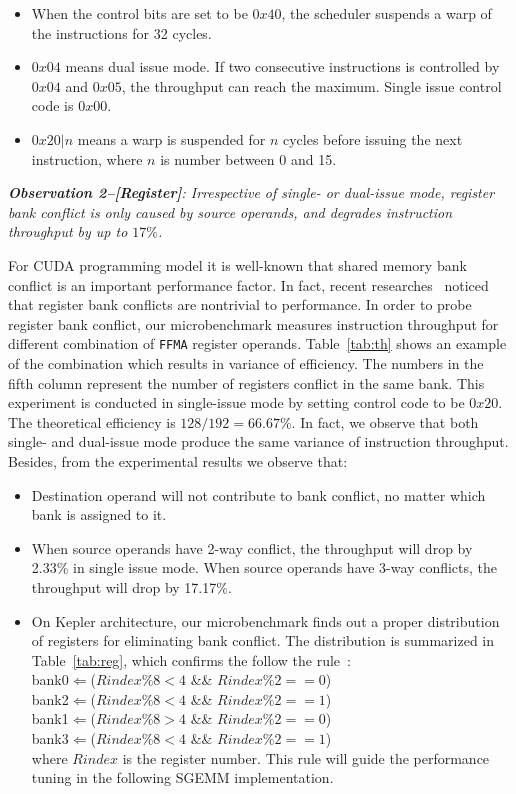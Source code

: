 \documentclass{sig-alternate-05-2015}
\begin{document}
\begin{itemize}
\item When the control bits are set to be $0x40$, the scheduler suspends a warp of the instructions for 32 cycles.
\item $0x04$ means dual issue mode. If two consecutive instructions is controlled by $0x04$ and $0x05$, the throughput can reach the maximum. Single issue control code is $0x00$.
\item $0x20|n$ means a warp is suspended for $n$ cycles before issuing the next instruction, where $n$ is number between 0 and 15.
\end{itemize}


{\em {\bf Observation 2--[Register]}: Irrespective of single- or dual-issue mode, register bank conflict is only caused by source operands, and degrades instruction throughput by up to $17\%$.}

For CUDA programming model it is well-known that shared memory bank conflict is an important performance factor. In fact, recent researches~\cite{} noticed that register bank conflicts are nontrivial to performance.  In order to probe register bank conflict, our microbenchmark measures instruction throughput for different combination of {\tt FFMA} register operands. Table~\ref{tab:th} shows an example of the combination which results in variance of efficiency. The numbers in the fifth column represent the number of registers conflict in the same bank. This experiment is conducted in single-issue mode by setting control code to be $0x20$. The theoretical efficiency is $128/192=66.67\%$. In fact, we observe that both single- and dual-issue mode produce the same variance of instruction throughput. Besides, from the experimental results we observe that:
\begin{itemize}
\item Destination operand will not contribute to bank conflict, no matter which bank is assigned to it.
\item When source operands have 2-way conflict, the throughput will drop by 2.33\% in single issue
    mode. When source operands have 3-way conflicts, the throughput will drop by 17.17\%.

 \item On Kepler architecture, our microbenchmark finds out a proper distribution of registers for eliminating bank conflict. The distribution is summarized in Table~\ref{tab:reg}, which confirms the follow the rule~\cite{}: \\
 bank0$\Leftarrow$($Rindex \% 8 < 4$ \&\& $Rindex \% 2 == 0$) \\
 bank2$\Leftarrow$($Rindex \% 8 < 4$ \&\&
$Rindex \% 2 == 1$) \\
bank1$\Leftarrow$($Rindex \% 8 > 4$ \&\& $Rindex \%2 == 0$) \\
bank3$\Leftarrow$($Rindex \% 8 < 4$ \&\&
$Rindex\% 2 == 1$)\\
where $Rindex$ is the register number. This rule will guide the performance tuning in the following SGEMM implementation.

\end{itemize}
\end{document}
